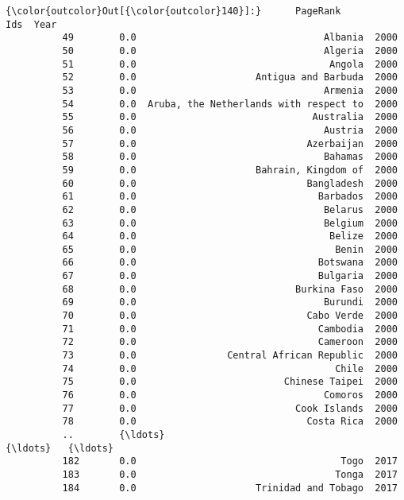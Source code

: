 \documentclass[11pt]{article}
\begin{document}
\begin{Verbatim}[commandchars=\\\{\}]
{\color{outcolor}Out[{\color{outcolor}140}]:}      PageRank                                     Ids  Year
          49        0.0                                 Albania  2000
          50        0.0                                 Algeria  2000
          51        0.0                                  Angola  2000
          52        0.0                     Antigua and Barbuda  2000
          53        0.0                                 Armenia  2000
          54        0.0  Aruba, the Netherlands with respect to  2000
          55        0.0                               Australia  2000
          56        0.0                                 Austria  2000
          57        0.0                              Azerbaijan  2000
          58        0.0                                 Bahamas  2000
          59        0.0                     Bahrain, Kingdom of  2000
          60        0.0                              Bangladesh  2000
          61        0.0                                Barbados  2000
          62        0.0                                 Belarus  2000
          63        0.0                                 Belgium  2000
          64        0.0                                  Belize  2000
          65        0.0                                   Benin  2000
          66        0.0                                Botswana  2000
          67        0.0                                Bulgaria  2000
          68        0.0                            Burkina Faso  2000
          69        0.0                                 Burundi  2000
          70        0.0                              Cabo Verde  2000
          71        0.0                                Cambodia  2000
          72        0.0                                Cameroon  2000
          73        0.0                Central African Republic  2000
          74        0.0                                   Chile  2000
          75        0.0                          Chinese Taipei  2000
          76        0.0                                 Comoros  2000
          77        0.0                            Cook Islands  2000
          78        0.0                              Costa Rica  2000
          ..        {\ldots}                                     {\ldots}   {\ldots}
          182       0.0                                    Togo  2017
          183       0.0                                   Tonga  2017
          184       0.0                     Trinidad and Tobago  2017

\end{Verbatim}
\end{document}
